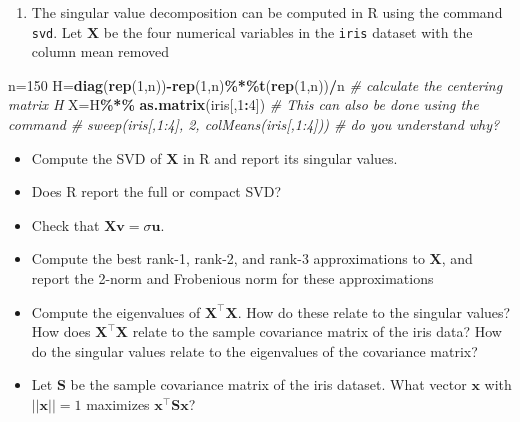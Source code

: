 \documentclass[
]{book}
\newenvironment{Shaded}{\begin{snugshade}}{\end{snugshade}}
\newcommand{\CommentTok}[1]{\textcolor[rgb]{0.56,0.35,0.01}{\textit{#1}}}
\newcommand{\DecValTok}[1]{\textcolor[rgb]{0.00,0.00,0.81}{#1}}
\newcommand{\FunctionTok}[1]{\textcolor[rgb]{0.13,0.29,0.53}{\textbf{#1}}}
\newcommand{\NormalTok}[1]{#1}
\newcommand{\OtherTok}[1]{\textcolor[rgb]{0.56,0.35,0.01}{#1}}
\newcommand{\SpecialCharTok}[1]{\textcolor[rgb]{0.81,0.36,0.00}{\textbf{#1}}}
\providecommand{\tightlist}{%
  \setlength{\itemsep}{0pt}\setlength{\parskip}{0pt}}
\theoremstyle{definition}
\theoremstyle{definition}
\theoremstyle{definition}
\theoremstyle{definition}
\theoremstyle{remark}
\begin{document}
\begin{enumerate}
\def\labelenumi{\arabic{enumi}.}
\setcounter{enumi}{1}
\tightlist
\item
  The singular value decomposition can be computed in R using the command \texttt{svd}. Let \(\mathbf X\) be the four numerical variables in the \texttt{iris} dataset with the column mean removed
\end{enumerate}

\begin{Shaded}
\begin{Highlighting}[]
\NormalTok{n}\OtherTok{=}\DecValTok{150}
\NormalTok{H}\OtherTok{=}\FunctionTok{diag}\NormalTok{(}\FunctionTok{rep}\NormalTok{(}\DecValTok{1}\NormalTok{,n))}\SpecialCharTok{{-}}\FunctionTok{rep}\NormalTok{(}\DecValTok{1}\NormalTok{,n)}\SpecialCharTok{\%*\%}\FunctionTok{t}\NormalTok{(}\FunctionTok{rep}\NormalTok{(}\DecValTok{1}\NormalTok{,n))}\SpecialCharTok{/}\NormalTok{n   }\CommentTok{\# calculate the centering matrix H}
\NormalTok{X}\OtherTok{=}\NormalTok{H}\SpecialCharTok{\%*\%} \FunctionTok{as.matrix}\NormalTok{(iris[,}\DecValTok{1}\SpecialCharTok{:}\DecValTok{4}\NormalTok{])}
\CommentTok{\# This can also be done using the command}
\CommentTok{\# sweep(iris[,1:4], 2, colMeans(iris[,1:4]))  \# do you understand why?}
\end{Highlighting}
\end{Shaded}

\begin{itemize}
\item
  Compute the SVD of \(\mathbf X\) in R and report its singular values.
\item
  Does R report the full or compact SVD?
\item
  Check that \(\mathbf X\mathbf v= \sigma \mathbf u\).
\item
  Compute the best rank-1, rank-2, and rank-3 approximations to \(\mathbf X\), and report the 2-norm and Frobenious norm for these approximations
\item
  Compute the eigenvalues of \(\mathbf X^\top \mathbf X\). How do these relate to the singular values? How does \(\mathbf X^\top \mathbf X\) relate to the sample covariance matrix of the iris data? How do the singular values relate to the eigenvalues of the covariance matrix?
\item
  Let \(\mathbf S\) be the sample covariance matrix of the iris dataset. What vector \(\mathbf x\) with \(||\mathbf x||=1\) maximizes \(\mathbf x^\top \mathbf S\mathbf x\)?
\end{itemize}
\end{document}
